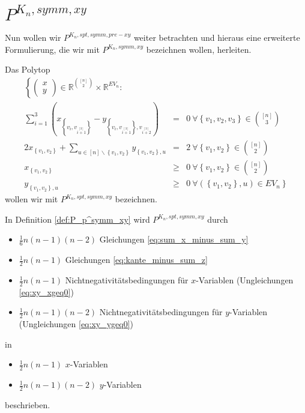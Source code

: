 \documentclass[10p,a4paper,BCOR = 12mm, DIV=15]{scrbook}
\begin{document}
{\section{$P^{K_n, symm, xy}$}

Nun wollen wir $P^{K_n, spt, symm, pre-xy}$ weiter betrachten und hieraus eine erweiterte Formulierung, die wir mit $P^{K_n, symm, xy}$ bezeichnen wollen, herleiten.

\begin{Def}
\label{def:P_p^symm_xy}
Das Polytop
\begin{eqnarray}
\left\{ \left(\begin{array}{c}
x \\
y
\end{array}\right)\in\mathbb{R}^{[n]\choose 2}\times \mathbb{R}^{EV_n}: \right.
\nonumber & & \\
\sum_{i=1}^3 \left(x_{\left\{v_{i}, v_{i \stackrel{\left[3\right]}{+} 1}\right\}} -  y_{\left\{v_{i}, v_{i \stackrel{\left[3\right]}{+} 1}\right\}, v_{i \stackrel{\left[3\right]}{+} 2}}\right) & = & 0\ \forall \left\{v_1, v_2, v_3\right\}\in {[n] \choose 3} \label{eq:sum_x_minus_sum_y} \\
2 x_{\left\{v_1, v_2\right\}} + \sum_{u\in[n]\backslash\left\{v_1, v_2\right\}} y_{\left\{v_1, v_2\right\}, u} & = & 2\ \forall \left\{v_1, v_2\right\}\in {[n] \choose 2} \label{eq:kante_minus_sum_z} \\
x_{\left\{v_1, v_2\right\}} & \geq & 0 \ \forall \left\{v_1, v_2\right\} \in {\left[n\right] \choose 2} \label{eq:xy_xgeq0} \\
y_{\left\{v_1, v_2\right\}, u} & \geq & \left.0 \ \forall \left(\left\{v_1, v_2\right\}, u\right) \in EV_n\right\} \label{eq:xy_ygeq0}
\end{eqnarray}
wollen wir mit $P^{K_n, spt, symm, xy}$ bezeichnen.
\end{Def}

\begin{Bem}
\label{bem:gleichungen_Pxy}
In Definition \ref{def:P_p^symm_xy} wird $P^{K_n, spt, symm, xy}$ durch
\begin{itemize}
\item $\frac{1}{6} n \left(n-1\right) \left(n-2\right)$ Gleichungen \eqref{eq:sum_x_minus_sum_y}
\item $\frac{1}{2} n \left(n-1\right)$ Gleichungen \eqref{eq:kante_minus_sum_z}
\item $\frac{1}{2} n \left(n-1\right)$ Nichtnegativitätsbedingungen für $x$-Variablen (Ungleichungen \eqref{eq:xy_xgeq0})
\item $\frac{1}{2} n \left(n-1\right) \left(n-2\right)$ Nichtnegativitätsbedingungen für $y$-Variablen (Ungleichungen \eqref{eq:xy_ygeq0})
\end{itemize}
in
\begin{itemize}
\item $\frac{1}{2} n \left(n-1\right)$ $x$-Variablen
\item $\frac{1}{2} n \left(n-1\right) \left(n-2\right)$ $y$-Variablen
\end{itemize}
beschrieben.
\end{Bem}

}
\end{document}
